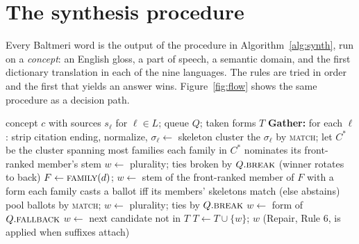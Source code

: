 \section{The synthesis procedure}\label{sec:procedure}

Every Baltmeri word is the output of the procedure in Algorithm~\ref{alg:synth}, run on a \emph{concept}: an English gloss, a part of speech, a semantic domain, and the first dictionary translation in each of the nine languages. The rules are tried in order and the first that yields an answer wins. Figure~\ref{fig:flow} shows the same procedure as a decision path.

\begin{algorithm}[t]
\caption{Lexicogenesis: Rules 0--6 of the Manual.}
\label{alg:synth}
\begin{algorithmic}[1]
\Require concept $c$ with sources $s_\ell$ for $\ell \in L$; queue $Q$; taken forms $T$
\State \textbf{Gather:} for each $\ell$: strip citation ending, normalize, $\sigma_\ell \gets$ skeleton 
\State cluster the $\sigma_\ell$ by \textsc{match}; let $C^\ast$ be the cluster spanning most families
 
  \State each family in $C^\ast$ nominates its front-ranked member's stem
  \State $w \gets$ plurality; ties broken by $Q.\textsc{break}$ (winner rotates to back)
 
  \State $F \gets \textsc{family}(d)$; $w \gets$ stem of the front-ranked member of $F$ with a form
\Else {}
  \State each family casts a ballot iff its members' skeletons match (else abstains)
  \State pool ballots by \textsc{match}; $w \gets$ plurality; ties by $Q.\textsc{break}$
   $w \gets$ form of $Q.\textsc{fallback}$ 
  \EndIf
\EndIf
{} $w \gets$ next candidate not in $T$ 
\EndIf
\State $T \gets T \cup \{w\}$; \Return $w$ (Repair, Rule 6, is applied when suffixes attach)
\end{algorithmic}
\end{algorithm}

